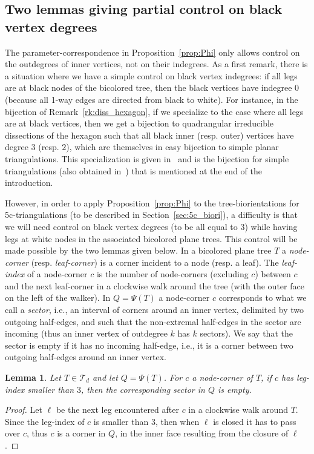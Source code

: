 \documentclass[letter]{amsart}
\numberwithin{theo}{section}
\newtheorem{lemma}[theo]{Lemma}
\theoremstyle{remark}
\def\cT{\mathcal{T}}
\begin{document}
\subsection{Two lemmas giving partial control on black vertex degrees}\label{sec:partial}
The parameter-correspondence in Proposition~\ref{prop:Phi} only allows control on the outdegrees of inner vertices, not on their indegrees. As a first remark, there is a situation where we have a simple control on black vertex indegrees: if all legs are at black nodes of the bicolored tree, then the black vertices have indegree $0$ (because all 1-way edges are directed from black to white). For instance, in the bijection of Remark~\ref{rk:diss_hexagon}, if we specialize to the case where all legs are at black vertices, then we get a bijection to quadrangular irreducible dissections of the hexagon such that all black inner (resp. outer) vertices have degree $3$ (resp. $2$), which are themselves in easy bijection to simple planar triangulations. This specialization is given in~\cite{FuPoScL} and is the bijection for simple triangulations (also obtained in~\cite{Bernardi-Fusy:dangulations}) that is mentioned at the end of the introduction. 

However, in order to apply Proposition~\ref{prop:Phi} to the tree-biorientations for  5c-triangulations (to be described in Section~\ref{sec:5c_biori}), a difficulty is that we will need control on black vertex degrees (to be all equal to $3$) while having legs at white nodes in the associated bicolored plane trees. %
This control will be made possible by the two lemmas given below. In a bicolored plane tree $T$ a \emph{node-corner} (resp. \emph{leaf-corner}) is a corner incident to a node (resp. a leaf). The \emph{leaf-index} of a node-corner $c$ is the number of node-corners (excluding $c$) between $c$ and the next leaf-corner in a clockwise walk around the tree (with the outer face on the left of the walker). In $Q=\Psi(T)$ a node-corner $c$ corresponds to what we call a \emph{sector}, i.e., an interval of corners around an inner vertex, delimited by two outgoing half-edges, and such that the non-extremal half-edges in the sector are incoming (thus an inner vertex of outdegree $k$ has $k$ sectors). We say that the sector is empty if it has no incoming half-edge, i.e., it is a corner between two outgoing half-edges around an inner vertex.  

\begin{lemma}\label{lem:legindex1}
Let $T\in\cT_d$ and  let $Q=\Psi(T)$. For $c$ a node-corner of $T$, if $c$ has leg-index smaller than $3$, then the corresponding sector in $Q$ is empty. 
\end{lemma}
\begin{proof}
Let $\ell$ be the next leg encountered after $c$ in a clockwise walk around $T$. Since the leg-index of $c$ is smaller than $3$, then when $\ell$ is closed it has to pass over $c$, thus $c$ is a corner in $Q$, in the inner face resulting from the closure of $\ell$. 
\end{proof}
\end{document}

